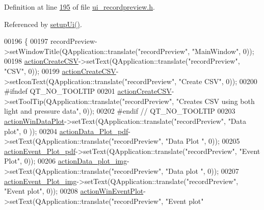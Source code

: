 Definition at line \hyperlink{a00140_source_l00195}{195} of file \hyperlink{a00140_source}{ui\+\_\+recordpreview.\+h}.



Referenced by \hyperlink{a00140_source_l00060}{setup\+Ui()}.


\begin{DoxyCode}
00196     \{
00197         recordPreview->setWindowTitle(QApplication::translate(\textcolor{stringliteral}{"recordPreview"}, \textcolor{stringliteral}{"MainWindow"}, 0));
00198         \hyperlink{a00081_ae81b7303db9e9c5d730c59b86ec0e960}{actionCreateCSV}->setText(QApplication::translate(\textcolor{stringliteral}{"recordPreview"}, \textcolor{stringliteral}{"CSV"}, 0));
00199         \hyperlink{a00081_ae81b7303db9e9c5d730c59b86ec0e960}{actionCreateCSV}->setIconText(QApplication::translate(\textcolor{stringliteral}{"recordPreview"}, \textcolor{stringliteral}{"Create CSV"}, 
      0));
00200 \textcolor{preprocessor}{#ifndef QT\_NO\_TOOLTIP}
00201         \hyperlink{a00081_ae81b7303db9e9c5d730c59b86ec0e960}{actionCreateCSV}->setToolTip(QApplication::translate(\textcolor{stringliteral}{"recordPreview"}, \textcolor{stringliteral}{"Creates CSV
       using both light and pressure data"}, 0));
00202 \textcolor{preprocessor}{#endif // QT\_NO\_TOOLTIP}
00203         \hyperlink{a00081_aa09067a9c96c9cd78f75261a9fcb89f0}{actionWinDataPlot}->setText(QApplication::translate(\textcolor{stringliteral}{"recordPreview"}, \textcolor{stringliteral}{"Data plot"}, 0
      ));
00204         \hyperlink{a00081_a19203ba5fef3bc68f3d88f1dd3c94777}{actionData\_Plot\_pdf}->setText(QApplication::translate(\textcolor{stringliteral}{"recordPreview"}, \textcolor{stringliteral}{"Data Plot
      "}, 0));
00205         \hyperlink{a00081_a4369770edbf9cb6131a066ca10b3f863}{actionEvent\_Plot\_pdf}->setText(QApplication::translate(\textcolor{stringliteral}{"recordPreview"}, \textcolor{stringliteral}{"Event
       Plot"}, 0));
00206         \hyperlink{a00081_ae841c150cf6131bef2e8d12da0401ce2}{actionData\_plot\_img}->setText(QApplication::translate(\textcolor{stringliteral}{"recordPreview"}, \textcolor{stringliteral}{"Data plot
      "}, 0));
00207         \hyperlink{a00081_a789f5466c7f1781c13d4d027e982ca55}{actionEvent\_Plot\_img}->setText(QApplication::translate(\textcolor{stringliteral}{"recordPreview"}, \textcolor{stringliteral}{"Event
       plot"}, 0));
00208         \hyperlink{a00081_ac72ec9c8679d46fd43a87f99ee6db893}{actionWinEventPlot}->setText(QApplication::translate(\textcolor{stringliteral}{"recordPreview"}, \textcolor{stringliteral}{"Event plot"}

\end{DoxyCode}
